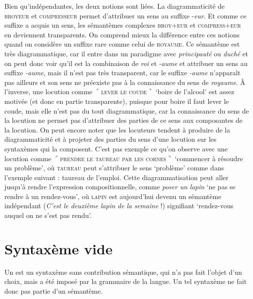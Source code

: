 Bien qu’indépendantes, les deux notions sont liées. La diagrammaticité de \textsc{broyeur} et \textsc{compresseur} permet d’attribuer un sens au suffixe -\textit{eur}. Et comme ce suffixe a acquis un sens, les sémantèmes complexes \textsc{broy+eur} et \textsc{compress+eur} en deviennent transparents. On comprend mieux la différence entre ces notions quand on considère un suffixe rare comme celui de \textsc{royaume}. Ce sémantème est très diagrammatique, car il entre dans un paradigme avec \textit{principauté} ou \textit{duché} et on peut donc voir qu’il est la combinaison de \textit{roi} et \textit{{}-aume} et attribuer un sens au suffixe \textit{{}-aume}, mais il n’est pas très transparent, car le suffixe \textit{{}-aume} n’apparaît pas ailleurs et son sens ne préexiste pas à la connaissance du sens de \textit{royaume}. À l’inverse, une locution comme $⌜$\textsc{lever} \textsc{le} \textsc{coude}$⌝$ ‘boire de l’alcool’ est assez motivée (et donc en partie transparente), puisque pour boire il faut lever le coude, mais elle n’est pas du tout diagrammatique, car la connaissance du sens de la locution ne permet pas d’attribuer des parties de ce sens aux composantes de la locution. On peut encore noter que les locuteurs tendent à produire de la diagrammaticité et à projeter des parties du sens d’une locution sur les syntaxèmes qui la composent. C’est pas exemple ce qu’on observe avec une locution comme $⌜$\textsc{prendre} \textsc{le} \textsc{taureau} \textsc{par} \textsc{les} \textsc{cornes}$⌝$ ‘commencer à résoudre un problème’, où \textsc{taureau} peut s’attribuer le sens ‘problème’ comme dans l’exemple suivant :  taureau de l’emploi. Cette diagrammatisation peut aller jusqu’à rendre l’expression compositionnelle, comme \textit{poser un lapin} ‘ne pas se rendre à un rendez-vous’, où \textsc{lapin} est aujourd’hui devenu un sémantème indépendant (\textit{C’est le deuxième lapin de la semaine} !) signifiant  ‘rendez-vous auquel on ne s'est pas rendu’.

\section{Syntaxème vide}\label{sec:2.3.3}

{Un  est un syntaxème sans contribution sémantique, qui n’a pas fait l’objet d’un choix, mais a été imposé par la grammaire de la langue. Un tel syntaxème ne fait donc pas partie d’un sémantème.}

